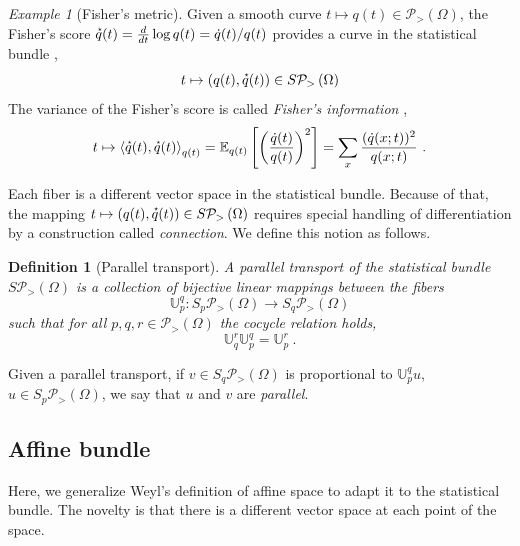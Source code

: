 \documentclass[axioms,article,submit,pdftex,moreauthors]{Definitions/mdpi}
\theoremstyle{plain}
\newtheorem{mydef}{Definition}
\theoremstyle{remark}
\newtheorem{myexample}{Example}
\newcommand{\Expectation}{\mathbb E}
\newcommand{\derivby}[1]{\frac{d}{d#1}}
\newcommand{\expbundleat}[1]{S\pdensitieson{#1}}
\newcommand{\expectat}[2]{\Expectation_{#1}\left[#2\right]}
\newcommand{\expfibreat}[2]{S_{#1}\pdensitieson{#2}}
\newcommand{\pdensitieson}[1]{\mathcal P_{>}\left(#1\right)}
\newcommand{\scalarat}[3]{\left\langle#2,#3\right\rangle_{#1}}
\newcommand{\transport}[2]{{\mathbb U} _ {#1} ^ {#2}}
\newcommand{\velocity}[1]{\accentset{\star}{#1}}
\begin{document}
\begin{myexample}[Fisher's metric] Given a smooth curve $t \mapsto q(t) \in \pdensitieson\Omega$, the Fisher's score $\velocity q(t) = \derivby t \log q(t) = \dot q(t)/q(t)$ provides a curve in the statistical bundle \cite{Duy2022Fisher},
\begin{equation*}
    t \mapsto (q(t),\velocity q(t)) \in \expbundleat\Omega
\end{equation*}
The variance of the Fisher's score is called \emph{Fisher's information} \cite{Ly2017A,Wei2016Mutual}, 
\begin{equation*}
    t \mapsto \scalarat {q(t)} {\velocity q(t)}{\velocity q(t)} = \expectat {q(t)} {\left(\frac{\dot q(t)}{q(t)}\right)^2} = \sum_x \frac{(\dot q(x;t))^2}{q(x;t)} \ . \end{equation*}
\end{myexample} 

Each fiber is a different vector space in the statistical bundle. Because of that, the mapping $t \mapsto (q(t),\velocity q(t)) \in \expbundleat \Omega$ requires special handling of differentiation by a construction called \emph{connection}. We define this notion as follows.

\begin{mydef}[Parallel transport] \label{def:parallel-transport} A \emph{parallel transport} of the statistical bundle $\expbundleat\Omega$ is a collection of bijective linear mappings between the fibers
\begin{equation} \label{eq:transport}
    \transport p q \colon \expfibreat p \Omega \to \expfibreat q \Omega
\end{equation}
such that for all $p,q,r \in \pdensitieson\Omega$ the \emph{cocycle relation} holds, 
\begin{equation} \label{eq:cocycle}
    \transport q r \transport p q = \transport p r \ .
\end{equation}
\end{mydef}

Given a parallel transport, if $v \in \expfibreat q \Omega$ is proportional to $\transport p q u$, $u \in \expfibreat p \Omega$, we say that $u$ and $v$ are \emph{parallel}.

\subsection{Affine bundle}

Here, we generalize Weyl's definition of affine space to adapt it to the statistical bundle. The novelty is that there is a different vector space at each point of the space.
\end{document}
